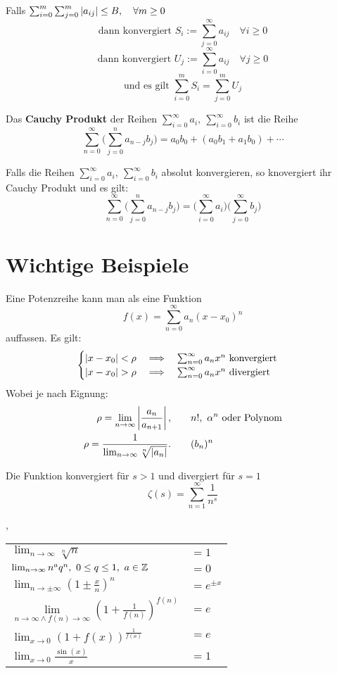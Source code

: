 \Satz[2.7.23] Falls $\sum_{i=0}^{m}\sum_{j=0}^{m}\left\lvert a_{ij} \right\rvert \leq B, \quad \forall m \geq 0$
\[ \text{dann konvergiert } S_{i} := \sum_{j=0}^{\infty} a_{ij} \quad \forall i \geq 0 \]
\[ \text{dann konvergiert } U_{j} := \sum_{i=0}^{\infty} a_{ij} \quad \forall j \geq 0 \]
\[ \text{und es gilt } \sum_{i=0}^{m} S_{i} = \sum_{j=0}^{m} U_{j} \]

\Satz[2.7.24] Das \textbf{Cauchy Produkt} der Reihen $\sum_{i=0}^{\infty} a_i, \ \sum_{i=0}^{\infty} b_i$ ist die Reihe
\[\sum_{n=0}^\infty \Bigg(\sum_{j=0}^{n} a_{n-j} b_{j} \Bigg) = a_0 b_0 + (a_0 b_1 + a_1 b_0) + \cdots  \]

\Satz[2.7.26] Falls die Reihen $\sum_{i=0}^{\infty} a_i, \ \sum_{i=0}^{\infty} b_i$ absolut konvergieren, so knovergiert ihr Cauchy Produkt und es gilt:
\[\sum_{n=0}^\infty \Bigg(\sum_{j=0}^{n} a_{n-j} b_{j} \Bigg) = \Bigg( \sum_{i=0}^\infty a_i \Bigg) \Bigg(\sum_{j=0}^\infty b_j \Bigg) \]



\section{Wichtige Beispiele}

\Bsp[Potenzreihe] Eine Potenzreihe kann man als eine Funktion 
\[
f(x)=\sum_{n=0}^\infty a_n
(x-x_0)^n
\]
auffassen. Es gilt:
\[
\begin{cases}
\left\lvert x-x_0 \right\rvert< \rho \quad \Longrightarrow \quad \sum_{n=0}^\infty a_nx^n \text{
konvergiert}\\
\left\lvert x-x_0 \right\rvert> \rho \quad \Longrightarrow \quad \sum_{n=0}^\infty a_nx^n \text{
divergiert}\\
\end{cases}
\]
Wobei je nach Eignung: 
\begin{align*}
\rho = \lim_{n\to\infty} \abs{\frac{a_n}{a_{n+1}}}, &\qquad n!, \ \alpha^{n}
\text{ oder Polynom}\\
\rho = \frac{1}{\lim_{n\to\infty}\sqrt[n]{\abs{a_n}}}. &\qquad(b_n)^n
\end{align*}



 Die Funktion konvergiert für $s>1$ und divergiert für $s=1$
$$\zeta(s)=\sum_{n=1}^{\infty} \frac{1}{n^{s}}$$

\sep
\begin{table}[H]
\centering
\begin{tabular}{p{4.5cm}p{1cm}}
$\lim_{n \rightarrow \infty} \sqrt[n]{n}$ & $=1$
\\
$\lim_{n \rightarrow \infty} n^{a}q^{n}, \ 0 \leq q \leq 1, \ a \in \mathbb{Z}$ & $=0$
\\
\midrule
$\lim _{n \rightarrow \pm \infty}\left(1 \pm \frac{x}{n}\right)^{n}$&$=e^{\pm x}$
\\
$\lim \limits_{n \rightarrow \infty \land f(n) \rightarrow \infty}\left(1+\frac{1}{f(n)}\right)^{f(n)}$ & $=e$
\\
$\lim _{x \rightarrow 0}(1+f(x))^{\frac{1}{f(x)}}$ & $=e$
\\
\midrule
$\lim _{x \rightarrow 0} \frac{\sin (x)}{x}$&$=1$
\end{tabular}
\end{table}